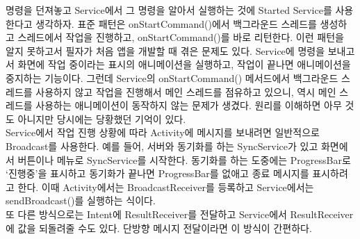 명령을 던져놓고 Service에서 그 명령을 알아서 실행하는 것에 Started Service를 사용한다고 생각하자.
표준 패턴은 onStartCommand()에서 백그라운드 스레드를 생성하고 
스레드에서 작업을 진행하고, onStartCommand()를 바로 리턴한다. 이런 패턴을 알지 못하고서 필자가 처음 앱을 개발할 때 겪은 문제도 있다. 
Service에 명령을 보내고서 화면에 작업 중이라는 표시의 애니메이션을 실행하고, 작업이 끝나면 애니메이션을 중지하는 기능이다.
그런데 Service의  onStartCommand() 메서드에서 백그라운드 스레드를 사용하지 않고 작업을 진행해서 메인 스레드를 점유하고 있으니, 역시 메인 스레드를 사용하는 애니메이션이 동작하지 않는 문제가 생겼다. 원리를 이해하면 아무 것도 아니지만 당시에는 당황했던 기억이 있다.\\

Service에서 작업 진행 상황에 따라 Activity에 메시지를 보내려면 일반적으로 Broadcast를 사용한다.
예를 들어, 서버와 동기화를 하는 SyncService가 있고 화면에서 버튼이나 메뉴로 SyncService를 시작한다. 
동기화를 하는 도중에는 ProgressBar로 `진행중'을 표시하고 동기화가 끝나면 ProgressBar를 없애고 종료 메시지를 표시하려고 한다.
이때 Activity에서는 BroadcastReceiver를 등록하고 Service에서는 sendBroadcast()를 실행하는 식이다.\\

또 다른 방식으로는 Intent에 ResultReceiver를 전달하고 Service에서 ResultReceiver에 값을 되돌려줄 수도 있다. 단방향 메시지 전달이라면 이 방식이 간편하다.\\

